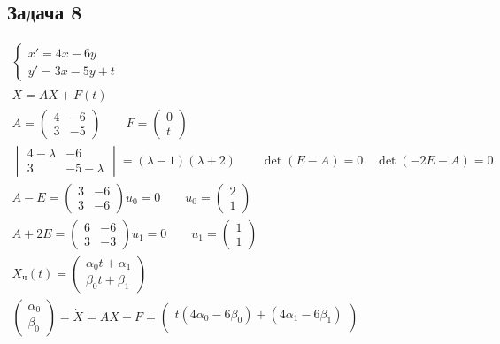 \subsection*{Задача 8}
	\begin{gather*}
	\begin{cases}
	x' = 4x - 6y\\
	y' = 3x - 5y + t
	\end{cases}\\
	\dot{X} = AX + F(t)\\
	A = 
	\begin{pmatrix}
		4 & -6\\
		3 & -5
	\end{pmatrix}
	\qquad
	F = 
	\begin{pmatrix}
		0 \\ t
	\end{pmatrix}\\
	\begin{vmatrix}
		4-\lambda & -6\\
		3 & -5-\lambda
	\end{vmatrix}
	= (\lambda - 1)(\lambda + 2)\qquad \det(E - A) = 0\quad \det(-2E - A) = 0\\
	A - E = 
	\begin{pmatrix}
		3 & -6\\
		3 & -6
	\end{pmatrix}
	u_0 = 0\qquad
	u_0 = 
	\begin{pmatrix}
		2 \\ 1
	\end{pmatrix}\\
	A + 2E = 
	\begin{pmatrix}
		6 & -6\\
		3 & -3
	\end{pmatrix}
	u_1 = 0\qquad
	u_1 = 
	\begin{pmatrix}
		1 \\ 1
	\end{pmatrix}\\
	X_{\text{ч}}(t) = 
	\begin{pmatrix}
		\alpha_0 t + \alpha_1\\
		\beta_0 t + \beta_1
	\end{pmatrix}\\
	\begin{pmatrix}
		\alpha_0 \\ \beta_0
	\end{pmatrix}
	= \dot{X} = AX + F =
	\begin{pmatrix}
		t(4\alpha_0 - 6\beta_0) + (4\alpha_1 - 6\beta_1)\\

\end{pmatrix}
\end{gather*}
